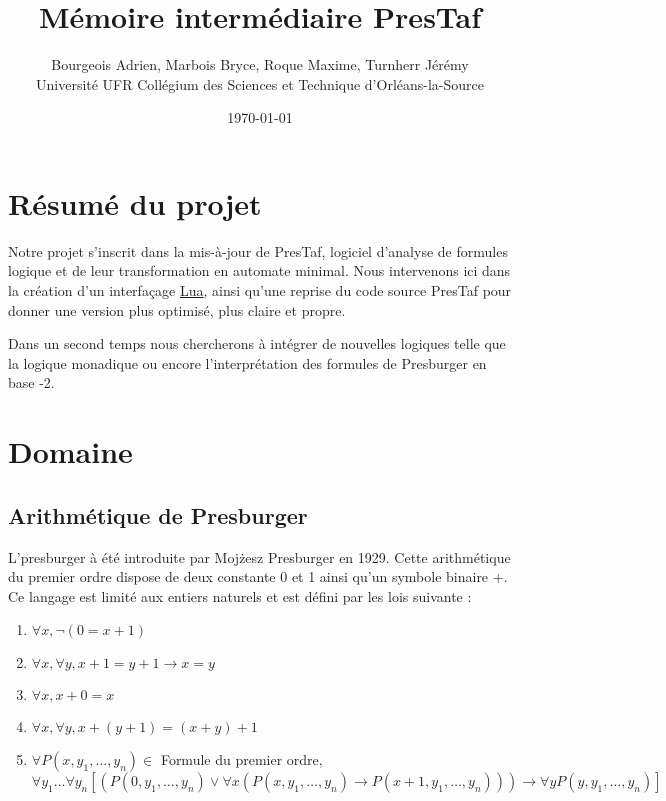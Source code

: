 \documentclass{article}%
\begin{document}
\title{Mémoire intermédiaire PresTaf}


\author{Bourgeois Adrien, Marbois Bryce, Roque Maxime, Turnherr Jérémy%
\\Université UFR Collégium des Sciences et Technique d'Orléans-la-Source}
\date{\today}
\maketitle



\tableofcontents

\section{Résumé du projet}

Notre projet s'inscrit dans la mis-à-jour de PresTaf, logiciel d'analyse de formules logique et de leur transformation en automate minimal. Nous intervenons ici dans la création d'un interfaçage \href{https://fr.wikipedia.org/wiki/Lua}{Lua}, ainsi qu'une reprise du code source PresTaf pour donner une version plus optimisé, plus claire et propre.\\\par

Dans un second temps nous chercherons à intégrer de nouvelles logiques telle que la logique monadique ou encore l'interprétation des formules de Presburger en base -2.

\section{Domaine}


\subsection{Arithmétique de Presburger}

L'\gls{presburger} à été introduite par Moj\.{z}esz Presburger en 1929. Cette arithmétique du premier ordre dispose de deux constante 0 et 1 ainsi qu'un symbole binaire +. Ce langage est limité aux entiers naturels et est défini par les lois suivante :
\begin{enumerate}
    \item $\forall x, \neg(0 = x + 1)$
    \item $\forall x, \forall y, x + 1 = y + 1 \rightarrow x = y $
    \item $\forall x, x + 0 = x$
    \item $\forall x, \forall y, x + (y + 1) = (x + y) + 1$
    \item $\forall P(x, y_1, \ldots, y_n) \in$ Formule du premier ordre, 
    $\forall y_1 \ldots \forall y_n [(P(0, y_1, \ldots,y_n) \vee \forall x(P(x, y_1, \ldots, y_n) \rightarrow P(x + 1, y_1, \ldots, y_n))) \rightarrow \forall y P(y, y_1, \ldots, y_n)]$
\end{enumerate}
\end{document}
